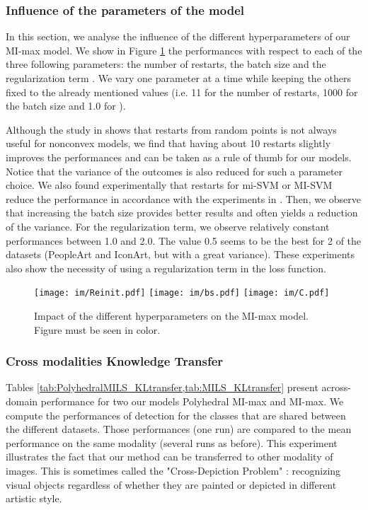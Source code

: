 \documentclass[preprint]{elsarticle}
\newcommand\MILS{MI-max}
\newcommand\MaxOfMaxS{Polyhedral MI-max}
\begin{document}
\subsubsection{Influence of the parameters of the model}
\label{sec:Param} 

In this section, we analyse the influence of the different hyperparameters of our \MILS{} model. We show in Figure \ref{fig:MIMAX_hyperParam} the performances with respect to each of the three following parameters: the number of restarts, the batch size and the regularization term . We vary one parameter at a time while keeping the others fixed to the already mentioned values (i.e. 11 for the number of restarts, 1000 for the batch size and 1.0 for ).

Although the study in \cite{doran_theoretical_2014} shows that restarts from random points is not always useful for nonconvex models, we find that having about 10 restarts slightly improves the performances and can be taken as a rule of thumb for our models. Notice that the variance of the outcomes is also reduced for such a parameter choice. 
We also found experimentally that restarts for mi-SVM or MI-SVM reduce the performance in accordance with the experiments in \cite{doran_theoretical_2014}. Then, we observe that increasing the batch size provides better results and often yields a reduction of the variance. 
For the regularization term, we observe relatively constant performances between 1.0 and 2.0. The value 0.5 seems to be the best for 2 of the datasets (PeopleArt and IconArt, but with a great variance). These experiments also show the necessity of using a regularization term in the loss function.

\begin{figure}[h]
\centering
  \hfill
     \texttt{[image: im/Reinit.pdf]}\hfill  
     \texttt{[image: im/bs.pdf]}\hfill
     \texttt{[image: im/C.pdf]}\hspace*{\fill} 
    \caption{Impact of the different hyperparameters on the \MILS{} model. Figure must be seen in color.}
    \label{fig:MIMAX_hyperParam}
\end{figure}


\subsubsection{Cross modalities Knowledge Transfer}
\label{sec:KnowledgeTransfer_crossMod}

Tables \cref{tab:PolyhedralMILS_KLtransfer,tab:MILS_KLtransfer} present across-domain performance for two our models \MaxOfMaxS{} and \MILS{}. We compute the performances of detection for the classes that are shared between the different datasets. Those performances (one run) are compared to the mean performance on the same modality (several runs as before).
This experiment illustrates the fact that our method can be transferred to other modality of images. This is sometimes called the "Cross-Depiction Problem" \cite{hall_crossdepiction_2015} : recognizing visual objects regardless of whether they are painted or depicted in different artistic style.
\end{document}
